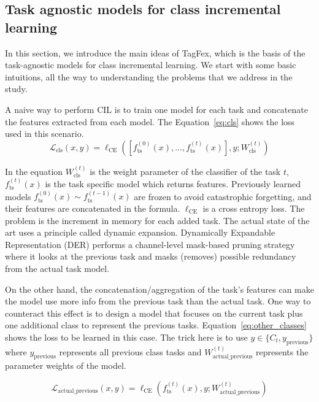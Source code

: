 \documentclass[letterpaper]{article} %
\begin{document}
\subsection{Task agnostic models for class incremental learning}

In this section, we introduce the main ideas of TagFex\cite{zheng2025task}, which is the basis of the task-agnostic models for class incremental learning.  We start with some basic intuitions, all the way to understanding the problems that we address in the study. 


A naive way to perform CIL is to train one model for each task and concatenate the features extracted from each model. The Equation~\ref{eq:cls} shows the loss used in this scenario. 
\begin{equation}\label{eq:cls}
\mathcal{L}_{\text{cls}}(x, y) = \ell_{\text{CE}}\left( \left[ f_{\text{ts}}^{(0)}(x), \ldots, f_{\text{ts}}^{(t)}(x) \right], y; W_{\text{cls}}^{(t)} \right)
\end{equation}

In the equation  $ W_{\text{cls}}^{(t)}$ is the weight parameter of the classifier of the task $t$, $f_{\text{ts}}^{(t)}(x)$ is the task specific model which returns features. Previously learned models $f_{\text{ts}}^{(0)}(x) \sim f_{\text{ts}}^{(t-1)}(x)$ are frozen to avoid catastrophic forgetting, and their features are concatenated in the formula.  $\ell_{\text{CE}}$ is a cross entropy loss. The problem is the increment in memory for each added task. The actual state of the art uses a principle called dynamic expansion. Dynamically  Expandable Representation (DER) \cite{yan2021dynamically}  performs a channel-level mask-based pruning strategy where it looks at the previous task and masks (removes) possible redundancy from the actual task model.  

On the other hand, the concatenation/aggregation of the task's features can make the model use more info from the previous task than the actual task. One way to counteract this effect is to design a model that focuses on the current task plus one additional class to represent the previous tasks. Equation~\ref{eq:other_classes} shows the loss to be learned in this case. The trick here is to use $y \in \{C_t, y_{\text{previous}}\}$ where $y_{\text{previous}}$ represents all previous class tasks and $W_{\text{actual\_previous}}^{(t)}$ represents the parameter weights of the model.

\begin{equation}\label{eq:other_classes}
\mathcal{L}_{\text{actual\_previous}}(x, y) = \ell_{\text{CE}}\left(f_{\text{ts}}^{(t)}(x), y; W_{\text{actual\_previous}}^{(t)}\right)
\end{equation}
\end{document}

